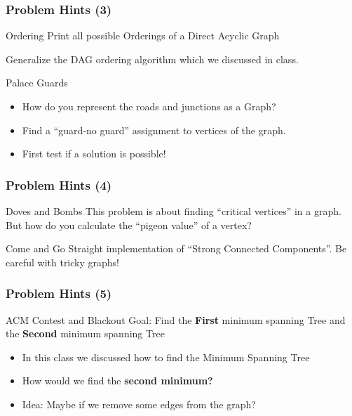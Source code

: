 \begin{frame}
  \frametitle{Problem Hints (3)}
  {\smaller
    \begin{block}{Ordering}
      Print all possible Orderings of a Direct Acyclic Graph

      \bigskip

      Generalize the DAG ordering algorithm which we discussed in class.
    \end{block}

    \begin{block}{Palace Guards}
      \begin{itemize}
        \item How do you represent the roads and junctions as a Graph?
        \item Find a ``guard-no guard'' assignment to vertices of the
          graph.
        \item First test if a solution is possible!
      \end{itemize}
    \end{block}
  }
\end{frame}

\begin{frame}
  \frametitle{Problem Hints (4)}
  {\smaller
    \begin{block}{Doves and Bombs}
      This problem is about finding ``critical vertices'' in a
      graph. But how do you calculate the ``pigeon value'' of a
      vertex?
    \end{block}

    \begin{block}{Come and Go}
      Straight implementation of ``Strong Connected Components''. Be
      careful with tricky graphs!
    \end{block}
  }
\end{frame}

\begin{frame}
  \frametitle{Problem Hints (5)}
  {\smaller
    \begin{block}{ACM Contest and Blackout}
      Goal: Find the {\bf First} minimum spanning Tree and the {\bf
        Second} minimum spanning Tree
    \end{block}

    \bigskip

    \begin{itemize}
    \item In this class we discussed how to find the Minimum Spanning Tree
    \item How would we find the {\bf second minimum?}
    \item Idea: Maybe if we remove some edges from the graph?
    \end{itemize}
  }
\end{frame}

